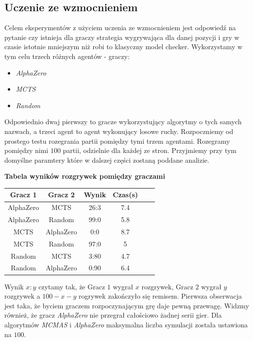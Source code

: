   \subsection*{Uczenie ze wzmocnieniem}
  Celem eksperymentów z użyciem uczenia ze wzmocnieniem jest odpowiedź na pytanie czy istnieja dla graczy 
  strategia wygrywająca dla danej pozycji i gry w czasie istotnie mniejszym niż robi to klasyczny model 
  checker. Wykorzystamy w tym celu trzech różnych agentów - graczy:
  \begin{itemize}
    \item \textit{AlphaZero} 
    \item \textit{MCTS} 
    \item \textit{Random}
  \end{itemize}
  Odpowiednio dwaj pierwszy to gracze wykorzystujący algorytmy o tych samych nazwach, a trzeci agent 
  to agent wykonujący losowe ruchy. Rozpoczniemy od prostego testu rozegrania 
  partii pomiędzy tymi trzem agentami. Rozegramy pomiędzy nimi $100$ partii, 
  odzielnie dla każdej ze stron. Przyjmiemy przy tym domyślne paramtery które w 
  dalszej części zostaną poddane analizie.
  \begin{center}
    \textbf{Tabela wyników rozgrywek pomiędzy graczami}
    \end{center}
  \begin{longtable}{|c|c|c|c|c|c|}
    \hline
    \textbf{Gracz 1} & \textbf{Gracz 2} & \textbf{Wynik} & \textbf{Czas}(s) \\ \hline
    AlphaZero & MCTS & 26:3 & 7.4 \\ \hline
    AlphaZero & Random & 99:0 & 5.8\\ \hline
    MCTS & AlphaZero & 0:0 & 8.7\\ \hline
    MCTS & Random & 97:0 &  5 \\  \hline
    Random & MCTS & 3:80 & 4.7 \\ \hline
    Random & AlphaZero & 0:90 & 6.4 \\ \hline
    \end{longtable}
    Wynik $x:y$ czytamy tak, że Gracz $1$ wygrał $x$ rozgrywek, Gracz $2$ wygrał  $y$ 
    rozgrywek a $100-x-y$ rogrywek zakończyło się remisem. Pierwsza obserwacja 
    jest taka, że byciem graczem rozpoczynającym grę daje pewną przewagę. Widzmy również, 
    że gracz \textit{AlphaZero} nie przegrał całościowo żadnej serii gier. Dla algorytmów 
    \textit{MCMAS} i \textit{AlphaZero} maksymalna liczba symulacji została ustawiona na $100$.

